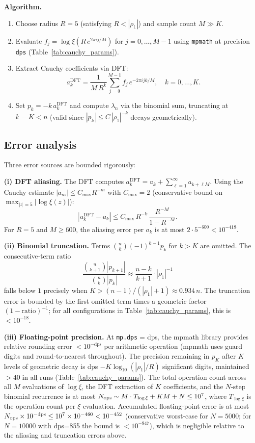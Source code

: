 \documentclass[11pt]{article}
\begin{document}
\textbf{Algorithm.}
\begin{enumerate}
\item Choose radius $R = 5$ (satisfying $R < |\rho_1|$) and sample count $M \gg K$.
\item Evaluate $f_j = \log\xi(R\,e^{2\pi i j/M})$ for $j = 0,\ldots,M-1$ using
  \texttt{mpmath} at precision \texttt{dps} (Table~\ref{tab:cauchy_params}).
\item Extract Cauchy coefficients via DFT:
  \[
    a_k^{\mathrm{DFT}} = \frac{1}{M\,R^k}\sum_{j=0}^{M-1} f_j\,e^{-2\pi ijk/M},
    \quad k = 0,\ldots,K.
  \]
\item Set $p_k = -k\,a_k^{\mathrm{DFT}}$ and compute $\lambda_n$ via the binomial sum,
  truncating at $k = K < n$ (valid since $|p_k| \le C\,|\rho_1|^{-k}$ decays geometrically).
\end{enumerate}

\subsection{Error analysis}

Three error sources are bounded rigorously:

\textbf{(i) DFT aliasing.}
The DFT computes $a_k^{\mathrm{DFT}} = a_k + \sum_{\ell=1}^\infty a_{k+\ell M}$.
Using the Cauchy estimate $|a_m| \le C_{\max} R^{-m}$ with $C_{\max} = 2$
(conservative bound on $\max_{|z|=5}|\log\xi(z)|$):
\[
  |a_k^{\mathrm{DFT}} - a_k| \le C_{\max}\,R^{-k}\,\frac{R^{-M}}{1-R^{-M}}.
\]
For $R=5$ and $M \ge 600$, the aliasing error per $a_k$ is at most $2\cdot 5^{-600} < 10^{-418}$.

\textbf{(ii) Binomial truncation.}
Terms $\binom{n}{k}(-1)^{k-1}p_k$ for $k > K$ are omitted. The consecutive-term ratio
\[
  \frac{\binom{n}{k+1}|p_{k+1}|}{\binom{n}{k}|p_k|} \approx \frac{n-k}{k+1}\cdot|\rho_1|^{-1}
\]
falls below $1$ precisely when $K > (n-1)/(|\rho_1|+1) \approx 0.934\,n$.
The truncation error is bounded by the first omitted term times a geometric factor
$(1-\text{ratio})^{-1}$; for all configurations in Table~\ref{tab:cauchy_params},
this is $< 10^{-18}$.

\textbf{(iii) Floating-point precision.}
At \texttt{mp.dps} = dps, the mpmath library provides relative rounding error
$< 10^{-\mathrm{dps}}$ per arithmetic operation (mpmath uses guard digits and
round-to-nearest throughout). The precision remaining in $p_K$ after $K$ levels of geometric
decay is dps $- K\log_{10}(|\rho_1|/R)$ significant digits, maintained $> 40$ in all runs
(Table~\ref{tab:cauchy_params}). The total operation count across all
$M$ evaluations of $\log\xi$, the DFT extraction of $K$ coefficients, and the $N$-step
binomial recurrence is at most $N_{\rm ops} \sim M \cdot T_{\log\xi} + KM + N \le 10^7$,
where $T_{\log\xi}$ is the operation count per $\xi$ evaluation.
Accumulated floating-point error is at most
$N_{\rm ops} \times 10^{-\mathrm{dps}} \le 10^7 \times 10^{-460} < 10^{-452}$ (conservative
worst-case for $N=5000$; for $N=10000$ with dps=855 the bound is $< 10^{-847}$),
which is negligible relative to the aliasing and truncation errors above.
\end{document}
